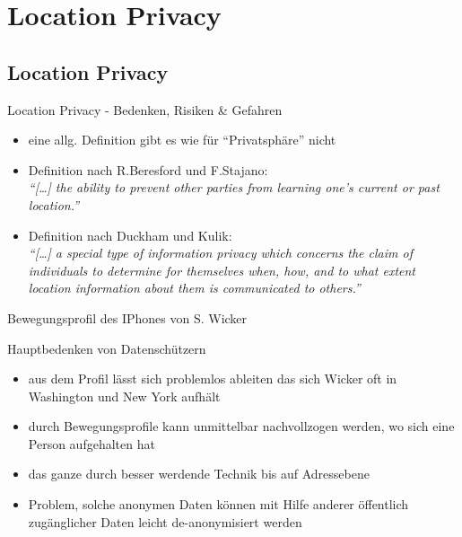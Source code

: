\section{Location Privacy}
\subsection{Location Privacy}
\begin{frame}{Location Privacy - Bedenken, Risiken \& Gefahren}
\begin{itemize}
  \item eine allg. Definition gibt es wie für "`Privatsphäre"' nicht
  \item Definition nach R.Beresford und F.Stajano:\\ \vspace{.5cm}
  \textit{"`[\dots] the ability to prevent other parties from learning one’s current or past location."'}
  \vspace{.5cm}
  \item Definition nach Duckham und Kulik:\\ \vspace{.5cm}
  \textit{"`[\dots] a special type of information privacy which concerns the claim of individuals to determine for themselves when, how, and to what extent location information about them is communicated to others."'}
\end{itemize}
\end{frame}

\begin{frame}{Bewegungsprofil des IPhones von S. Wicker}
  \begin{center}
  \end{center}
\end{frame}

\begin{frame}{Hauptbedenken von Datenschützern}
  \begin{itemize}
  \item aus dem Profil lässt sich problemlos ableiten das sich Wicker oft in Washington und New York aufhält
  \item durch Bewegungsprofile kann unmittelbar nachvollzogen werden, wo sich eine Person aufgehalten hat
  \item das ganze durch besser werdende Technik bis auf Adressebene
  \item Problem, solche anonymen Daten können mit Hilfe anderer öffentlich zugänglicher Daten leicht de-anonymisiert werden
  \end{itemize}
\end{frame}

